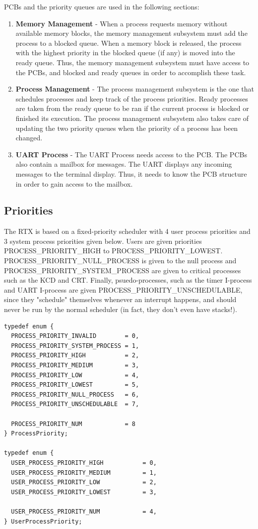 \documentclass[12pt]{report}
\begin{document}
PCBs and the priority queues are used in the following sections:
\begin{enumerate}
    \item {\bf Memory Management} - When a process requests memory without available memory blocks, the memory management subsystem must add the process to a blocked queue. When a memory block is released, the process with the highest priority in the blocked queue (if any) is moved into the ready queue. Thus, the memory management subsystem must have access to the PCBs, and blocked and ready queues in order to accomplish these task.
    \item {\bf Process Management} - The process management subsystem is the one that schedules processes and keep track of the process priorities. Ready processes are taken from the ready queue to be ran if the current process is blocked or finished its execution. The process management subsystem also takes care of updating the two priority queues when the priority of a process has been changed.
    \item {\bf UART Process} - The UART Process needs access to the PCB. The PCBs also contain a mailbox for messages. The UART displays any incoming messages to the terminal display. Thus, it needs to know the PCB structure in order to gain access to the mailbox.
\end{enumerate}

\subsection{Priorities}
The RTX is based on a fixed-priority scheduler with 4 user process priorities and 3 system process priorities given below. Users are given priorities PROCESS\_PRIORITY\_HIGH to PROCESS\_PRIORITY\_LOWEST. PROCESS\_PRIORITY\_NULL\_PROCESS is given to the null process and PROCESS\_PRIORITY\_SYSTEM\_PROCESS are given to critical processes such as the KCD and CRT. Finally, psuedo-processes, such as the timer I-process and UART I-process are given PROCESS\_PRIORITY\_UNSCHEDULABLE, since they "schedule" themselves whenever an interrupt happens, and should never be run by the normal scheduler (in fact, they don't even have stacks!).

\begin{lstlisting}
typedef enum {
  PROCESS_PRIORITY_INVALID        = 0,
  PROCESS_PRIORITY_SYSTEM_PROCESS = 1,
  PROCESS_PRIORITY_HIGH           = 2,
  PROCESS_PRIORITY_MEDIUM         = 3,
  PROCESS_PRIORITY_LOW            = 4,
  PROCESS_PRIORITY_LOWEST         = 5,
  PROCESS_PRIORITY_NULL_PROCESS   = 6,
  PROCESS_PRIORITY_UNSCHEDULABLE  = 7,

  PROCESS_PRIORITY_NUM            = 8
} ProcessPriority;

typedef enum {
  USER_PROCESS_PRIORITY_HIGH           = 0,
  USER_PROCESS_PRIORITY_MEDIUM         = 1,
  USER_PROCESS_PRIORITY_LOW            = 2,
  USER_PROCESS_PRIORITY_LOWEST         = 3,

  USER_PROCESS_PRIORITY_NUM            = 4,
} UserProcessPriority;
\end{lstlisting}
\end{document}

